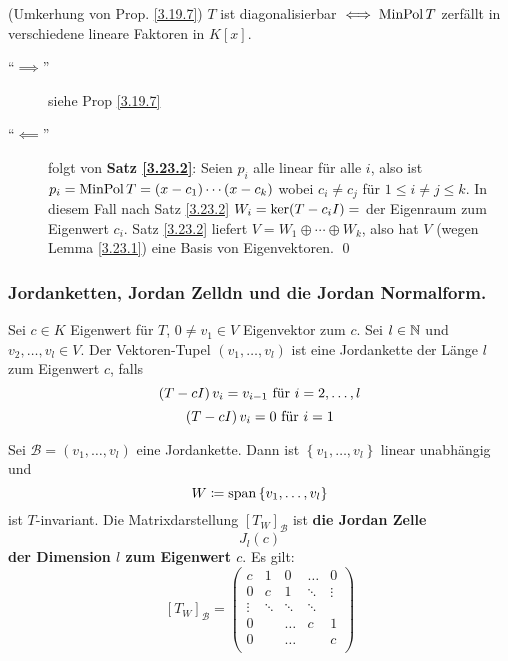 \begin{subtheorem}
	(Umkerhung von Prop. \ref{3.19.7})
	$ T $ ist diagonalisierbar $ \iff \operatorname{Min Pol} T $ zerfällt in verschiedene lineare Faktoren in $ K[x] $.
\end{subtheorem}
\begin{subproof*}
	\begin{description}
		\item[``$ \implies  $''] siehe Prop \ref{3.19.7}
		\item[``$ \impliedby  $'']
			folgt von \textbf{Satz \ref{3.23.2}}:
			Seien $ p_i $ alle linear für alle $ i $, also ist $ p_i = \operatorname{Min Pol} T = \left( x - c_1 \right) \dotsb \left( x - c_k \right)  $ wobei $ c_i \neq c_j $ für $ 1 \leq i \neq j \leq k $.
			In diesem Fall nach Satz \ref{3.23.2} $ W_i = \operatorname{ker}(T - c_i I) =  $ der Eigenraum zum Eigenwert $ c_i $.
			Satz \ref{3.23.2} liefert $ V = W_1 \oplus \dotsb \oplus W_k $, also hat $ V $ (wegen Lemma \ref{3.23.1}) eine Basis von Eigenvektoren. \qed
	\end{description}
\end{subproof*}

\subsubsection{Jordanketten, Jordan Zelldn und die Jordan Normalform.}
\begin{subdefinition}
	Sei $ c \in K $ Eigenwert für $ T $, $ 0 \neq v_1 \in V $ Eigenvektor zum $ c $.
	Sei $ l \in \mathbb{N}  $ und $ v_2, \dotsc, v_l \in V $.
	Der Vektoren-Tupel $ \left( v_1, \dotsc, v_l \right)  $ ist eine Jordankette der Länge $ l $ zum Eigenwert $ c $, falls
	\[
		\left( T - cI \right) v_i = v_{i - 1} \text{ für $ i = 2, \dotsc, l $} 
	\]
	\[
		\left( T - cI \right) v_i = 0 \text{ für $ i = 1 $} 
	\]
\end{subdefinition}

\begin{sublemma}
	Sei $ \mathcal{B} = (v_1, \dotsc, v_l) $ eine Jordankette.
	Dann ist $ \left\{ v_1, \dotsc, v_l \right\}  $ linear unabhängig und
	\[
		W \coloneqq \operatorname{span} \left\{ v_1, \dotsc, v_l \right\} 
	\]
	ist $ T $-invariant.
	Die Matrixdarstellung $ [T_W]_\mathcal{B}  $ ist \textbf{die Jordan Zelle
	\[
		J_l(c)
	\]
	der Dimension $ l $ zum Eigenwert $ c $}.
	Es gilt:
	\[
		[T_W]_{\mathcal{B} } = \begin{pmatrix} 
			c & 1 & 0 & \hdots & 0 \\
			0 & c & 1 &  \ddots & \vdots \\
			\vdots & \ddots & \ddots & \ddots & \\
			0 & & \hdots & c & 1 \\
			0 & & \hdots &   & c \\
		\end{pmatrix} 
	\]
\end{sublemma}

